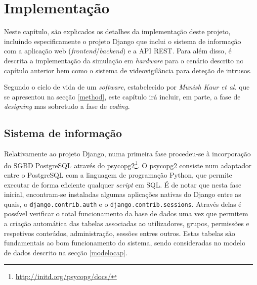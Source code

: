 



\chapter{Implementação}
\label{implementacao}





Neste capítulo, são explicados os detalhes da implementação deste projeto, incluindo especificamente o projeto Django que inclui o sistema de informação com a aplicação web (\textit{frontend}/\textit{backend}) e a API REST. Para além disso, é descrita a implementação da simulação em \textit{hardware} para o cenário descrito no capítulo anterior bem como o sistema de videovigilância para deteção de intrusos. 

Segundo o ciclo de vida de um \textit{software}, estabelecido por \textit{Munish Kaur et al.}\cite{Saini2014} que se apresentou na secção \ref{method}, este capítulo irá incluir, em parte, a fase de \textit{designing} mas sobretudo a fase de \textit{coding}. 





\section{Sistema de informação}


Relativamente ao projeto Django, numa primeira fase procedeu-se à incorporação do \ac{SGBD} PostgreSQL através do psycopg2\footnote{\url{http://initd.org/psycopg/docs/}}. O psycopg2 consiste num adaptador entre o PostgreSQL com a linguagem de programação Python, que permite executar de forma eficiente qualquer \textit{script} em \ac{SQL}. É de notar que nesta fase inicial, encontram-se instaladas algumas aplicações nativas do Django entre as quais, o  \texttt{django.contrib.auth} e  o \texttt{django.contrib.sessions}. Através delas é possível verificar o total funcionamento da base de dados uma vez que permitem a criação automática das tabelas associadas ao utilizadores, grupos, permissões e respetivos conteúdos, administração, sessões entres outros. Estas tabelas são fundamentais ao bom funcionamento do sistema, sendo consideradas no modelo de dados descrito na secção \ref{modelocap}. 


